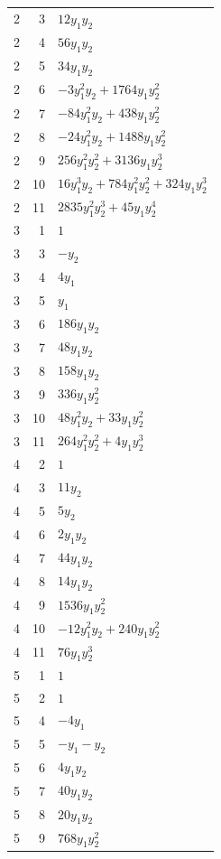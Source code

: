\documentclass[10pt,a4paper]{article}
\begin{document}
{\begin{longtable}{rrp{125mm}}
2 & 3 & $12 y_{1} y_{2}$\\
2 & 4 & $56 y_{1} y_{2}$\\
2 & 5 & $34 y_{1} y_{2}$\\
2 & 6 & $- 3 y_{1}^{2} y_{2} + 1764 y_{1} y_{2}^{2}$\\
2 & 7 & $- 84 y_{1}^{2} y_{2} + 438 y_{1} y_{2}^{2}$\\
2 & 8 & $- 24 y_{1}^{2} y_{2} + 1488 y_{1} y_{2}^{2}$\\
2 & 9 & $256 y_{1}^{2} y_{2}^{2} + 3136 y_{1} y_{2}^{3}$\\
2 & 10 & $16 y_{1}^{3} y_{2} + 784 y_{1}^{2} y_{2}^{2} + 324 y_{1} y_{2}^{3}$\\
2 & 11 & $2835 y_{1}^{2} y_{2}^{3} + 45 y_{1} y_{2}^{4}$\\
3 & 1 & $1$\\
3 & 3 & $- y_{2}$\\
3 & 4 & $4 y_{1}$\\
3 & 5 & $y_{1}$\\
3 & 6 & $186 y_{1} y_{2}$\\
3 & 7 & $48 y_{1} y_{2}$\\
3 & 8 & $158 y_{1} y_{2}$\\
3 & 9 & $336 y_{1} y_{2}^{2}$\\
3 & 10 & $48 y_{1}^{2} y_{2} + 33 y_{1} y_{2}^{2}$\\
3 & 11 & $264 y_{1}^{2} y_{2}^{2} + 4 y_{1} y_{2}^{3}$\\
4 & 2 & $1$\\
4 & 3 & $11 y_{2}$\\
4 & 5 & $5 y_{2}$\\
4 & 6 & $2 y_{1} y_{2}$\\
4 & 7 & $44 y_{1} y_{2}$\\
4 & 8 & $14 y_{1} y_{2}$\\
4 & 9 & $1536 y_{1} y_{2}^{2}$\\
4 & 10 & $- 12 y_{1}^{2} y_{2} + 240 y_{1} y_{2}^{2}$\\
4 & 11 & $76 y_{1} y_{2}^{3}$\\
5 & 1 & $1$\\
5 & 2 & $1$\\
5 & 4 & $- 4 y_{1}$\\
5 & 5 & $- y_{1} - y_{2}$\\
5 & 6 & $4 y_{1} y_{2}$\\
5 & 7 & $40 y_{1} y_{2}$\\
5 & 8 & $20 y_{1} y_{2}$\\
5 & 9 & $768 y_{1} y_{2}^{2}$\\

\end{longtable}}
\end{document}
